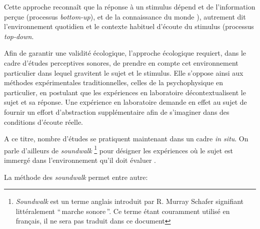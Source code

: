 Cette approche reconnaît que la réponse à un stimulus dépend et de l'information perçue (processus \emph{bottom-up}), et de la connaissance du monde ), autrement dit l'environnement quotidien et le contexte habituel d'écoute du stimulus (processus \emph{top-down}.

Afin de garantir une validité écologique, l’approche écologique requiert, dans le cadre d'études perceptives sonores, de prendre en compte cet environnement particulier dans lequel gravitent le sujet et le stimulus. Elle s'oppose ainsi aux méthodes expérimentales traditionnelles, celles de la psychophysique en particulier, en postulant que les expériences en laboratoire décontextualisent le sujet et sa réponse. Une expérience en laboratoire demande en effet au sujet de fournir un effort d'abstraction supplémentaire afin de s’imaginer dans des conditions d'écoute réelle.

A ce titre, nombre d'études se pratiquent maintenant dans un cadre \emph{in situ}. On parle d'ailleurs de \emph{soundwalk}  \footnote{\emph{Soundwalk} est un terme anglais introduit par R. Murray Schafer \citep{schafer1969new} signifiant littéralement ``\,marche sonore\,''. Ce terme étant couramment utilisé en français, il ne sera pas traduit dans ce document} pour désigner les expériences où le sujet est immergé dans l'environnement qu'il doit évaluer \citep{adams2008soundwalking,jeon2013soundwalk}.



La méthode des \emph{soundwalk} permet entre autre:

